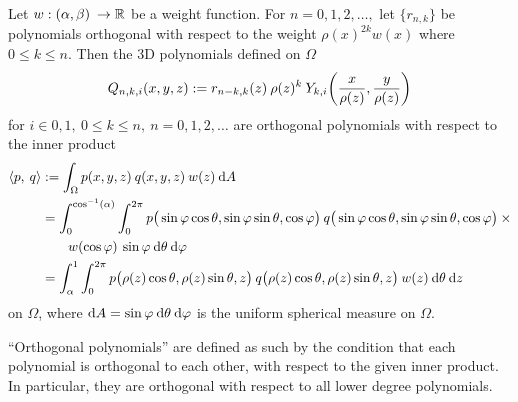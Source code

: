 \documentclass[11pt, oneside]{article}   	%
\begin{document}
\begin{proposition}\label{prop:construction}
	Let $w : (\alpha,\beta) \: \to \mathbb{R}$ be a weight function. For $n = 0,1,2,\dots, $ let $\{r_{n,k}\}$ be polynomials orthogonal with respect to the weight $\rho(x)^{2k} w(x)$ where $0 \le k \le n$. Then the 3D polynomials defined on $\Omega$
\begin{align*}
	\scopnki(x,y,z) := r_{n-k,k}(z) \: \rho(z)^k \: \ch_{k,i}\fpr({x \over \rho(z)}, {y \over \rho(z)})
\end{align*}
for $i \in {0,1}, \: 0 \le k \le n, \: n = 0,1,2,\dots$ are orthogonal polynomials with respect to the inner product
\begin{align*}
	\ip< p, \: q > &:= \int_\Omega p(x,y,z) \: q(x,y,z) \: w(z) \: \D A \\
	&= \int_0^{\cos^{-1}(\alpha)} \int_0^{2\pi} p\big(\sinphi \costheta, \sinphi \sintheta, \cosphi \big) \: q\big(\sinphi \costheta, \sinphi \sintheta, \cosphi \big) \: \times \\
	&\qquad w(\cosphi) \: \sinphi \: \D \theta \: \D \varphi \\
	&= \int_\alpha^1 \int_0^{2\pi} p\big(\rho(z) \cos\theta, \rho(z) \sin\theta, z\big) \: q\big(\rho(z) \cos\theta, \rho(z) \sin \theta, z\big) \: w(z) \: \D \theta \: \D z
\end{align*}
on $\Omega$, where ${\rm d} A = \sin\varphi \: {\rm d} \theta \: {\rm d} \varphi$ is the uniform spherical measure on $\Omega$. 
\end{proposition}
\enquote{Orthogonal polynomials} are defined as such by the condition that each polynomial is orthogonal to each other, with respect to the given inner product. In particular, they are orthogonal with respect to all lower degree polynomials. 
\end{document}
